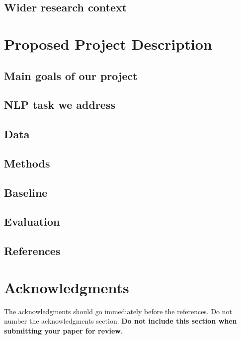 \documentclass[11pt,a4paper]{article}
\begin{document}
\subsection{Wider research context}

\section{Proposed Project Description}

\subsection{Main goals of our project}

\subsection{NLP task we address}

\subsection{Data}

\subsection{Methods}

\subsection{Baseline}

\subsection{Evaluation}

\subsection{References}

\section*{Acknowledgments}

The acknowledgments should go immediately before the references. Do not number the acknowledgments section.
\textbf{Do not include this section when submitting your paper for review.}




\end{document}

